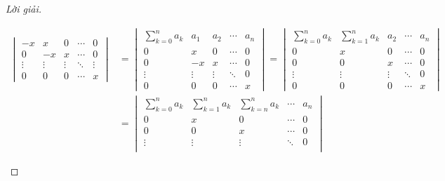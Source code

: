 \documentclass[class=linearalgebra,crop=false]{standalone}
\begin{document}
\begin{proof}[Lời giải]
\begin{enumerate}[label = (\alph*)]
\begin{align*}
\begin{vmatrix}
                      -x     & x      & 0      & \cdots & 0      \\
                      0      & -x     & x      & \cdots & 0      \\
                      \vdots & \vdots & \vdots & \ddots & \vdots \\
                      0      & 0      & 0      & \cdots & x
                  \end{vmatrix}
                   & =
                  \begin{vmatrix}
                      \sum^{n}_{k=0}a_{k} & a_{1}  & a_{2}  & \cdots & a_{n} \\
                      0                   & x      & 0      & \cdots & 0     \\
                      0                   & -x     & x      & \cdots & 0     \\
                      \vdots              & \vdots & \vdots & \ddots & 0     \\
                      0                   & 0      & 0      & \cdots & x
                  \end{vmatrix}
                  =
                  \begin{vmatrix}
                      \sum^{n}_{k=0}a_{k} & \sum^{n}_{k=1}a_{k} & a_{2}  & \cdots & a_{n} \\
                      0                   & x                   & 0      & \cdots & 0     \\
                      0                   & 0                   & x      & \cdots & 0     \\
                      \vdots              & \vdots              & \vdots & \ddots & 0     \\
                      0                   & 0                   & 0      & \cdots & x
                  \end{vmatrix} \\
                   & =
                  \begin{vmatrix}
                      \sum^{n}_{k=0}a_{k} & \sum^{n}_{k=1}a_{k} & \sum^{n}_{k=n}a_{k} & \cdots & a_{n} \\
                      0                   & x                   & 0                   & \cdots & 0     \\
                      0                   & 0                   & x                   & \cdots & 0     \\
                      \vdots              & \vdots              & \vdots              & \ddots & 0     \\

\end{vmatrix}
\end{align*}
\end{enumerate}
\end{proof}
\end{document}
